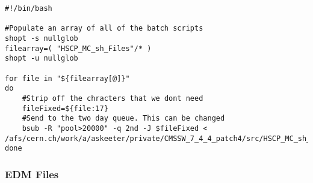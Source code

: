 \documentclass[11pt]{article}
\begin{document}
\begin{enumerate}
\begin{enumerate}
\begin{verbatim}
#!/bin/bash

#Populate an array of all of the batch scripts 
shopt -s nullglob
filearray=( "HSCP_MC_sh_Files"/* )
shopt -u nullglob

for file in "${filearray[@]}"
do
    #Strip off the chracters that we dont need
    fileFixed=${file:17}
    #Send to the two day queue. This can be changed
    bsub -R "pool>20000" -q 2nd -J $fileFixed < /afs/cern.ch/work/a/askeeter/private/CMSSW_7_4_4_patch4/src/HSCP_MC_sh_Files/$fileFixed
done
\end{verbatim}
\end{enumerate}
\end{enumerate}

\subsubsection{EDM Files}
\label{sec-1-1-3}
\end{document}
